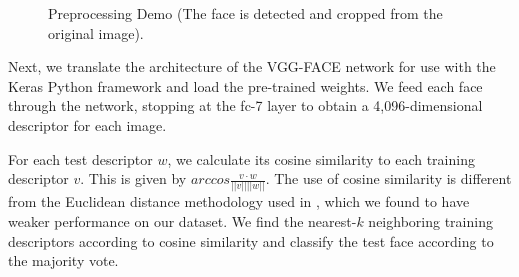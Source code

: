 \documentclass[pageno]{cos429}
\begin{document}
\begin{figure}[!htb]
\caption{Preprocessing Demo (The face is detected and cropped from the original image).}
\label{fig:vgg_preprocessing}

\end{figure}

Next, we translate the architecture of the VGG-FACE network for use with the Keras Python framework and load the pre-trained weights. We feed each face through the network, stopping at the fc-7 layer to obtain a 4,096-dimensional descriptor for each image.

For each test descriptor $w$, we calculate its cosine similarity to each training descriptor $v$. This is given by $arccos\frac{v \cdot w}{||v|| ||w||}$. The use of cosine similarity is different from the Euclidean distance methodology used in \cite{parkhi_deep_2015}, which we found to have weaker performance on our dataset. We find the nearest-$k$ neighboring training descriptors according to cosine similarity and classify the test face according to the majority vote.
\end{document}
